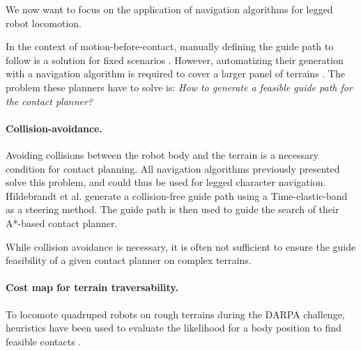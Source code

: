 We now want to focus on the application of navigation algorithms for legged robot locomotion.

In the context of motion-before-contact, manually defining the guide path to follow is a solution for fixed scenarios \cite{Chestnutt2003}.
However, automatizing their generation with a navigation algorithm is required to cover a larger panel of terrains \cite{darpa_hutter_2022}.
The problem these planners have to solve is: \textit{How to generate a feasible guide path for the contact planner?}




\paragraph{Collision-avoidance.}
Avoiding collisions between the robot body and the terrain is a necessary condition for contact planning.
All navigation algorithms previously presented solve this problem, and could thus be used for legged character navigation.
Hildebrandt et al. \cite{Hildebrandt_lola_2017} generate a collision-free guide path using a Time-elastic-band as a steering method. The guide path is then used to guide the search of their A*-based contact planner.

While collision avoidance is necessary, it is often not sufficient to ensure the guide feasibility of a given contact planner on complex terrains.

\paragraph{Cost map for terrain traversability.}
To locomote quadruped robots on rough terrains during the DARPA challenge, heuristics have been used to evaluate the likelihood for a body position to find feasible contacts \cite{kolter_2008, terrain_map_mrinal_2011}.

